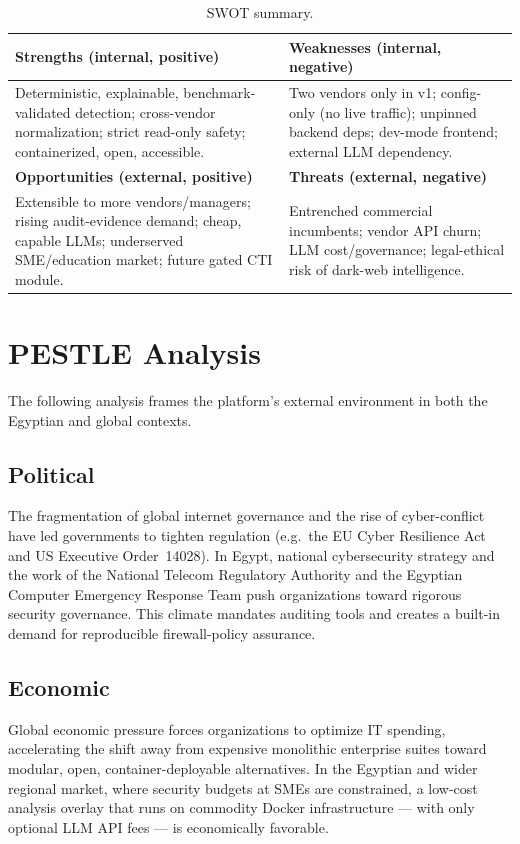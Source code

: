 \documentclass[12pt,a4paper]{report}
\renewcommand{\_}{\textunderscore\allowbreak}
\newcommand{\hcell}[1]{\textbf{#1}}
\begin{document}
\begin{table}[ht]
\centering
\caption{SWOT summary.}\label{tab:ch1-swot}
\begin{tabular}{|L{0.46\textwidth}|L{0.46\textwidth}|}
\hline
\hcell{Strengths (internal, positive)} & \hcell{Weaknesses (internal, negative)} \\ \hline
Deterministic, explainable, benchmark-validated detection; cross-vendor normalization; strict read-only safety; containerized, open, accessible. &
Two vendors only in v1; config-only (no live traffic); unpinned backend deps; dev-mode frontend; external LLM dependency. \\ \hline
\hcell{Opportunities (external, positive)} & \hcell{Threats (external, negative)} \\ \hline
Extensible to more vendors/managers; rising audit-evidence demand; cheap, capable LLMs; underserved SME/education market; future gated CTI module. &
Entrenched commercial incumbents; vendor API churn; LLM cost/governance; legal-ethical risk of dark-web intelligence. \\ \hline
\end{tabular}
\end{table}

\section{PESTLE Analysis}
\label{sec:ch1-pestle}

The following analysis frames the platform's external environment in both the Egyptian and global contexts.

\subsection{Political}
The fragmentation of global internet governance and the rise of cyber-conflict have led governments to tighten regulation (e.g.\ the EU Cyber Resilience Act and US Executive Order~14028). In Egypt, national cybersecurity strategy and the work of the National Telecom Regulatory Authority and the Egyptian Computer Emergency Response Team push organizations toward rigorous security governance. This climate mandates auditing tools and creates a built-in demand for reproducible firewall-policy assurance.

\subsection{Economic}
Global economic pressure forces organizations to optimize IT spending, accelerating the shift away from expensive monolithic enterprise suites toward modular, open, container-deployable alternatives. In the Egyptian and wider regional market, where security budgets at SMEs are constrained, a low-cost analysis overlay that runs on commodity Docker infrastructure --- with only optional LLM API fees --- is economically favorable.
\end{document}
